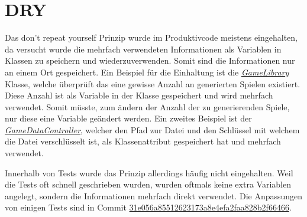 \section{DRY}
Das \glqq don't repeat yourself\grqq{} Prinzip wurde im Produktivcode meistens eingehalten, da versucht wurde die mehrfach verwendeten Informationen als Variablen in Klassen zu speichern und wiederzuverwenden. Somit sind die Informationen nur an einem Ort gespeichert. Ein Beispiel für die Einhaltung ist die \href{https://github.com/EinToni/Wortfinder/blob/main/Wortfinder/GameLibrary.cs}{\textit{GameLibrary}} Klasse, welche überprüft das eine gewisse Anzahl an generierten Spielen existiert. Diese Anzahl ist als Variable in der Klasse gespeichert und wird mehrfach verwendet. Somit müsste, zum ändern der Anzahl der zu generierenden Spiele, nur diese eine Variable geändert werden. Ein zweites Beispiel ist der \href{https://github.com/EinToni/Wortfinder/blob/main/Wortfinder/GameDataController.cs}{\textit{GameDataController}}, welcher den Pfad zur Datei und den Schlüssel mit welchem die Datei verschlüsselt ist, als Klassenattribut gespeichert hat und mehrfach verwendet.


Innerhalb von Tests wurde das Prinzip allerdings häufig nicht eingehalten. Weil die Tests oft schnell geschrieben wurden, wurden oftmals keine extra Variablen angelegt, sondern die Informationen mehrfach direkt verwendet. Die Anpassungen von einigen Tests sind in Commit \href{https://github.com/EinToni/Wortfinder/commit/31e056a85512623173a8e4efa2faa828b2f66466}{31e056a85512623173a8e4efa2faa828b2f66466}.
\endinput